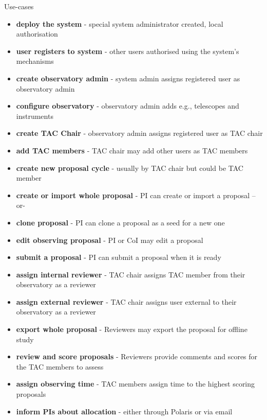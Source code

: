 \documentclass[final]{beamer}
\newlength{\colwidth}
\begin{document}
\begin{frame}[t]
\begin{columns}[t]
\begin{column}{\colwidth}
\begin{block}{Use-cases}
                    \begin{itemize}
                        \item \textbf{deploy the system} - special system administrator created, local authorisation
                        \item \textbf{user registers to system} - other users authorised using the system's mechanisms
                        \item \textbf{create observatory admin} - system admin assigns registered user as observatory admin
                        \item \textbf{configure observatory} - observatory admin adds e.g., telescopes and instruments
                        \item \textbf{create TAC Chair} - observatory admin assigns registered user as TAC chair
                        \item \textbf{add TAC members} - TAC chair may add other users as TAC members
                        \item \textbf{create new proposal cycle} - usually by TAC chair but could be TAC member
                        \item \textbf{create or import whole proposal} - PI can create or import a proposal --or-
                        \item \textbf{clone proposal} - PI can clone a proposal as a seed for a new one
                        \item \textbf{edit observing proposal} - PI or CoI may edit a proposal
                        \item \textbf{submit a proposal} - PI can submit a proposal when it is ready
                        \item \textbf{assign internal reviewer} - TAC chair assigns TAC member from their observatory as a reviewer
                        \item \textbf{assign external reviewer} - TAC chair assigns user external to their observatory as a reviewer
                        \item \textbf{export whole proposal} - Reviewers may export the proposal for offline study
                        \item \textbf{review and score proposals} - Reviewers provide comments and scores for the TAC members to assess
                        \item \textbf{assign observing time} - TAC members assign time to the highest scoring proposals
                        \item \textbf{inform PIs about allocation} - either through Polaris or via email
                    \end{itemize}


\end{block}
\end{column}
\end{columns}
\end{frame}
\end{document}
